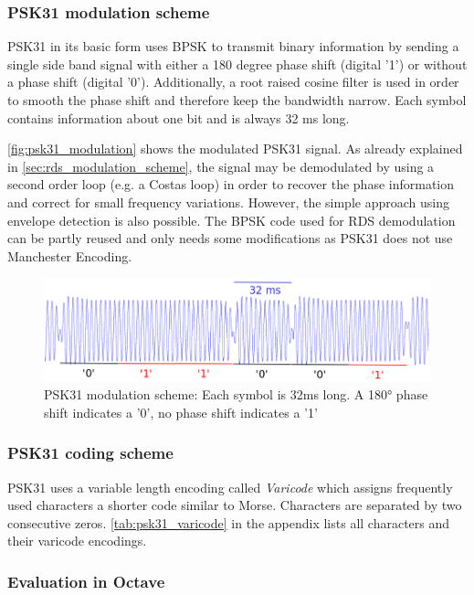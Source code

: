 \subsubsection{PSK31 modulation scheme}

\ac{PSK31} in its basic form uses \ac{BPSK} to transmit binary information by
sending a single side band signal with either a 180 degree phase shift (digital
'1') or without a phase shift (digital '0'). Additionally, a root raised cosine
filter is used in order to smooth the phase shift and therefore keep the
bandwidth narrow.  Each symbol contains information about one bit and is always
32 ms long.

\autoref{fig:psk31_modulation} shows the modulated \ac{PSK31} signal. As already
explained in \autoref{sec:rds_modulation_scheme}, the signal may be demodulated
by using a second order loop (e.g. a Costas loop) in order to recover the phase
information and correct for small frequency variations. However, the simple approach
using envelope detection is also possible. The \ac{BPSK} code used for \ac{RDS}
demodulation can be partly reused and only needs some modifications as \ac{PSK31}
does not use Manchester Encoding.

\begin{figure}
	\centering
	\includegraphics[width=1\linewidth]{gfx/psk31/psk31_modulation.png}
	\caption{PSK31 modulation scheme: Each symbol is 32ms long. A 180° phase
	shift indicates a '0', no phase shift indicates a '1'}
	\label{fig:psk31_modulation}
\end{figure}

\subsubsection{PSK31 coding scheme}

\ac{PSK31} uses a variable length encoding called \emph{Varicode} which assigns
frequently used characters a shorter code similar to Morse. Characters are separated
by two consecutive zeros. \autoref{tab:psk31_varicode} in the appendix lists all
characters and their varicode encodings.

\subsubsection{Evaluation in Octave}


